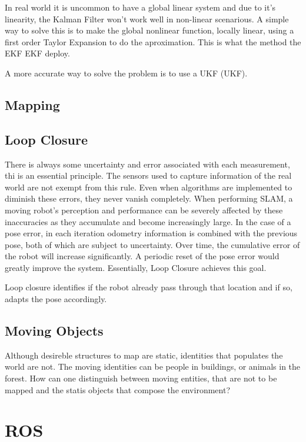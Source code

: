 In real world it is uncommon to have a global linear system and due to it's linearity, the Kalman Filter won't work well in non-linear scenarious. A simple way to solve this is to make the global nonlinear function, locally linear, using a first order Taylor Expansion to do the aproximation. This is what the method the \acl{EKF} \acs*{EKF} deploy.


 A more accurate way to solve the problem is to use a \acl*{UKF} (\acs*{UKF}).

 \subsection{Mapping}

\subsection{Loop Closure}

There is always some uncertainty and error associated with each measurement, thi is an essential principle. The sensors used to capture information of the real world are not exempt from this rule. Even when algorithms are implemented to diminish these errors, they never vanish completely. When performing \acs*{SLAM}, a moving robot's perception and performance can be severely affected by these inaccuracies as they accumulate and become increasingly large. In the case of a pose error, in each iteration odometry information is combined with the previous pose, both of which are subject to uncertainty. Over time, the cumulative error of the robot will increase significantly. A periodic reset of the pose error would greatly improve the system. Essentially, Loop Closure achieves this goal.


Loop closure identifies if the robot already pass through that location and if so, adapts the pose accordingly.

\subsection{Moving Objects}

Although desireble structures to map are static, identities that populates the world are not. The moving identities can be people in buildings, or animals in the forest. How can one distinguish between moving entities, that are not to be mapped and the statis objects that compose the environment?


\section{\acs{ROS}}


